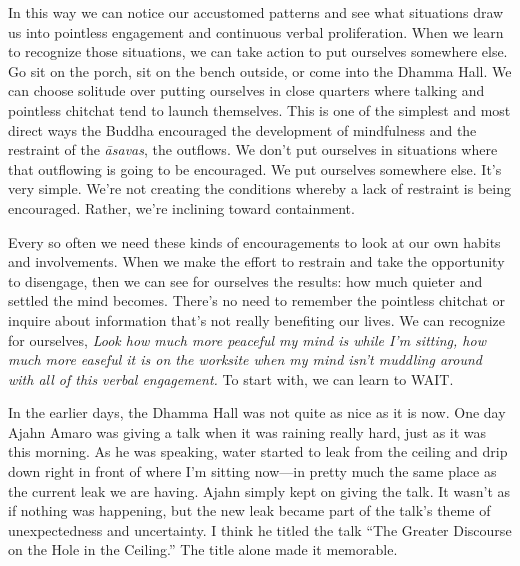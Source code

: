 In this way we can notice our accustomed patterns and see what 
situations draw us into pointless engagement and continuous verbal 
proliferation. When we learn to recognize those situations, we can take 
action to put ourselves somewhere else. Go sit on the porch, sit on the 
bench outside, or come into the Dhamma Hall. We can choose solitude 
over putting ourselves in close quarters where talking and pointless 
chitchat tend to launch themselves. This is one of the simplest and 
most direct ways the Buddha encouraged the development of mindfulness 
and the restraint of the \emph{āsavas}, the outflows. We don't put 
ourselves in situations where that outflowing is going to be 
encouraged. We put ourselves somewhere else. It's very simple. We're 
not creating the conditions whereby a lack of restraint is being 
encouraged. Rather, we're inclining toward containment.

Every so often we need these kinds of encouragements to look at our own 
habits and involvements. When we make the effort to restrain and take 
the opportunity to disengage, then we can see for ourselves the 
results: how much quieter and settled the mind becomes. There's no need 
to remember the pointless chitchat or inquire about information that's 
not really benefiting our lives. We can recognize for ourselves, 
\emph{Look how much more peaceful my mind is while I'm sitting, how 
much more easeful it is on the worksite when my mind isn't muddling 
around with all of this verbal engagement.} To start with, we can learn 
to WAIT.


In the earlier days, the Dhamma Hall was not quite as nice as it is 
now. One day Ajahn Amaro was giving a talk when it was raining really 
hard, just as it was this morning. As he was speaking, water started to 
leak from the ceiling and drip down right in front of where I'm sitting 
now---in pretty much the same place as the current leak we are having. 
Ajahn simply kept on giving the talk. It wasn't as if nothing was 
happening, but the new leak became part of the talk's theme of 
unexpectedness and uncertainty. I think he titled the talk ``The 
Greater Discourse on the Hole in the Ceiling.'' The title alone made it 
memorable.

